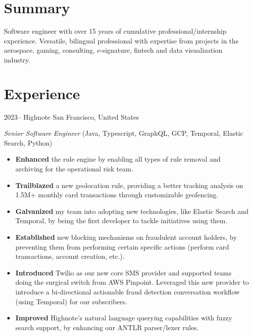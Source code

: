 \documentclass[]{friggeri-cv}
\begin{document}
\section{Summary}

Software engineer with over 15 years of cumulative professional/internship experience. Versatile, bilingual professional with expertise from projects in the aerospace, gaming, consulting, e-signature, fintech and data visualization industry.
\section{Experience}
\begin{entrylist}
\entry
{2023--}
{Highnote}
{San Francisco, United States}
{\emph{Senior Software Engineer} (Java, Typescript, GraphQL, GCP, Temporal, Elastic Search, Python)
\begin{itemize}
	\item \textbf{Enhanced} the rule engine by enabling all types of rule removal and archiving for the operational risk team.
	\item \textbf{Trailblazed} a new geolocation rule, providing a better tracking analysis on 1.5M+ monthly card transactions through customizable geofencing.
	\item \textbf{Galvanized} my team into adopting new technologies, like Elastic Search and Temporal, by being the first developer to tackle initiatives using them.
	\item \textbf{Established} new blocking mechanisms on fraudulent account holders, by preventing them from performing certain specific actions (perform card transactions, account creation, etc.).
	\item \textbf{Introduced} Twilio as our new core SMS provider and supported teams doing the surgical switch from AWS Pinpoint. Leveraged this new provider to introduce a bi-directional actionable fraud detection conversation workflow (using Temporal) for our subscribers.
	\item \textbf{Improved} Highnote's natural language querying capabilities with fuzzy search support, by enhancing our ANTLR parser/lexer rules.
\end{itemize}
}
\end{entrylist}
\end{document}
